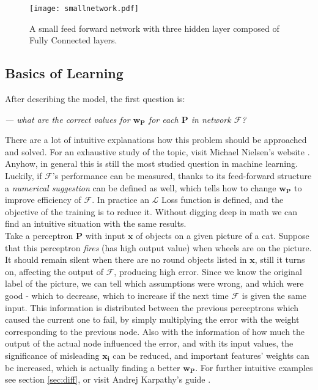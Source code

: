 \begin{figure}
	\centering
	\texttt{[image: smallnetwork.pdf]}
	\caption{A small feed forward network with three hidden layer composed of Fully Connected layers.
	}
	\label{fig:ff}
\end{figure}

\subsection{Basics of Learning}
After describing the model, the first question is:
\begin{flushright}
    \emph{--- what are the correct values for $\mathbf{w_P}$ for each $   
    \mathbf{P}$ in network $\mathcal{F}$?} \\ 
\end{flushright}
There are a lot of intuitive explanations how this problem should be approached and solved. 
For an exhaustive study of the topic, visit Michael Nielsen's website \cite{nnsdl}. 
Anyhow, in general this is still the most studied question in machine learning. 
Luckily, if $\mathcal{F}$'s performance can be measured, thanks to its feed-forward structure a \emph{numerical suggestion} can be defined as well, which tells how to change $\mathbf{w_P}$ to improve efficiency of $\mathcal{F}$. In practice an $\mathcal{L}$ Loss function is defined, and the objective of the training is to reduce it. Without digging deep in math we can find an intuitive situation with the same results.\\

Take a perceptron $\mathbf{P}$ with input $\mathbf{x}$ of objects on a given picture of a cat. Suppose that this perceptron \emph{fires} (has high output value) when wheels are on the picture. It should remain silent when there are no round objects listed in 
$\mathbf{x}$, still it turns on, affecting the output of $\mathcal{F}$, producing high error.
Since we know the original label of the picture, we can tell which assumptions were wrong, and which were good - which to decrease, which to increase if the next time $\mathcal{F}$ is given the same input. 
This information is distributed between the previous perceptrons which caused the current one to fail, by simply multiplying the error with the weight corresponding to the previous node. 
Also with the information of how much the output of the actual node influenced the error, and with its input values, the significance of misleading $\mathbf{x_i}$ can be reduced, and important features' weights can be increased, which is actually finding a better $\mathbf{w_P}$.
For further intuitive examples see section \ref{sec:diff}, or visit Andrej Karpathy's guide \cite{karpathyblog}.

